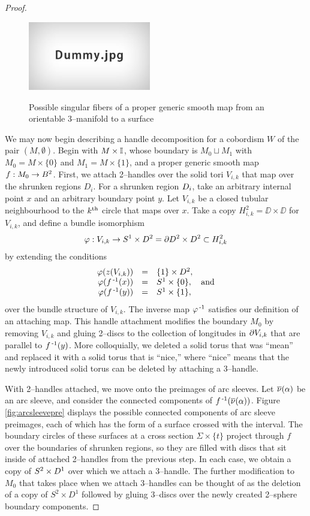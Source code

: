 \begin{proof}
	\begin{figure}
		\centering
		\captionsetup{justification=centering}
		\caption{Possible singular fibers of a proper generic smooth map from an orientable 3--manifold to a surface}
		\includegraphics[height=3cm]{figures/dummy.jpg}
		\label{fig:saekising}
	\end{figure}
	
	We may now begin describing a handle decomposition for a cobordism $W$ of the pair $(M,\emptyset)$.
	Begin with $M\times\mathbb{I}$, whose boundary is $M_0\sqcup M_1$ with $M_0=M\times\{0\}$ and $M_1 = M\times\{1\}$, and a proper generic smooth map $f:M_0\to B^2$.
	First, we attach 2--handles over the solid tori $V_{i,k}$ that map over the shrunken regions $D_i$.
	For a shrunken region $D_i$, take an arbitrary internal point $x$ and an arbitrary boundary point $y$.
	Let $V_{i,k}$ be a closed tubular neighbourhood to the $k^{\text{th}}$ circle that maps over $x$.
	Take a copy $H_{i,k}^2=\DD\times\DD$ for $V_{i,k}$, and define a bundle isomorphism
	\[
		\varphi : V_{i,k}\to S^1\times D^2 = \partial D^2\times D^2\subset H_{i,k}^2
	\]
	by extending the conditions
	\[
		\begin{array}{rclr}
			\varphi(z(V_{i,k})) 	& = & \{1\}\times D^2,	& \\
			\varphi(f^{\,\text{-}1}(x))  		& = & S^1\times\{0\},	&\textrm{and} \\ 
			\varphi(f^{\,\text{-}1}(y)) 		& = & S^1\times\{1\}, 		&			
		\end{array}	
	\]
	over the bundle structure of $V_{i,k}$.
	The inverse map $\varphi^{\,\text{-}1}$ satisfies our definition of an attaching map.
	This handle attachment modifies the boundary $M_0$ by removing $V_{i,k}$ and gluing 2--discs to the collection of longitudes in $\partial V_{i,k}$ that are parallel to $f^{\,\text{-}1}(y)$.
	More colloquially, we deleted a solid torus that was ``mean'' and replaced it with a solid torus that is ``nice,'' where ``nice'' means that the newly introduced solid torus can be deleted by attaching a 3--handle.
		
	With 2--handles attached, we move onto the preimages of arc sleeves.
	Let $\overline{\nu}(\alpha)$ be an arc sleeve, and consider the connected components of $f^{\,\text{-}1}(\overline{\nu}(\alpha))$.
	Figure \ref{fig:arcsleevepre} displays the possible connected components of arc sleeve preimages, each of which has the form of a surface crossed with the interval.
	The boundary circles of these surfaces at a cross section $\Sigma\times\{t\}$ project through $f$ over the boundaries of shrunken regions, so they are filled with discs that sit inside of attached 2--handles from the previous step.
	In each case, we obtain a copy of $S^2\times D^1$ over which we attach a 3--handle.
	The further modification to $M_0$ that takes place when we attach 3--handles can be thought of as the deletion of a copy of $S^2\times D^1$ followed by gluing 3--discs over the newly created 2--sphere boundary components.
	

\end{proof}
